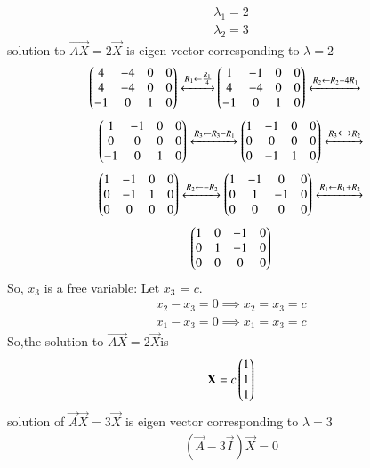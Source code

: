 \documentclass[journal,12pt,twocolumn]{IEEEtran}
\begin{document}
\begin{align}
 \lambda_1=2\\
 \lambda_2=3
 \end{align}
solution to $\vec{AX} =2\vec{X}$ is eigen vector corresponding to $\lambda=2$
\begin{align}
\begin{pmatrix}4& -4&0&0\\
4 & -4 & 0&0\\
-1 & 0 &1&0
\end{pmatrix}
\xleftrightarrow[]{R_1 \leftarrow \frac{R_1}{4}} 
&
\begin{pmatrix}1&-1&0&0\\
4&-4&0&0\\
-1&0&1&0\end{pmatrix}
\xleftrightarrow[]{R_2 \leftarrow R_2-4R_1 } \nonumber 
\end{align}
\begin{align}
    \begin{pmatrix}1&-1&0&0\\
            0&0&0&0\\
            -1&0&1&0\end{pmatrix}
    \xleftrightarrow[]{R_3 \leftarrow R_3-R_1 }
    \begin{pmatrix}1&-1&0&0\\
            0&0&0&0\\
            0&-1&1&0\end{pmatrix}
    \xleftrightarrow[]{R_3 \xleftrightarrow[]{} R_2 } \nonumber
\end{align}
\begin{align}
    \begin{pmatrix}1&-1&0&0\\
    0&-1&1&0\\
    0&0&0&0\end{pmatrix}
    \xleftrightarrow[]{R_2 \leftarrow -R_2} 
    \begin{pmatrix}1&-1&0&0\\
    0&1&-1&0\\
    0&0&0&0\end{pmatrix}   
    \xleftrightarrow[]{R_1 \leftarrow R_1+R_2} \nonumber
\end{align}
\begin{align} \label{eq:eq_5}
    \begin{pmatrix}1&0&-1&0\\
    0&1&-1&0\\
    0&0&0&0\end{pmatrix} 
\end{align}
So, $x_3$ is a free variable: Let $x_3$ = $c$. 
\begin{align}
 {x_2}-{x_3}=0 \implies{x_2}={x_3}=c \\
 {x_1}-{x_3}=0 \implies{x_1}={x_3}=c 
 \end{align}
 So,the solution to $\vec{AX} =2\vec{X}$is
 \begin{align}\label{eq:555}
 \mathbf{X} = 
 c
 \begin{pmatrix}
 1\\1\\1
 \end{pmatrix}
\end{align}
 solution of $\vec{A}\vec{X}=3\vec{X}$ is eigen vector corresponding to $\lambda=3$ 
 \begin{align}\label{eq11}
(\vec{A}-3\vec{I})\vec X=0
\end{align}
\end{document}
